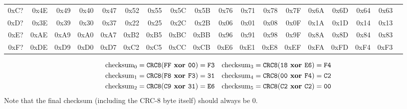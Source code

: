 \begin{table}[h]
{\begin{tabular}{|r||r|r|r|r|r|r|r|r|r|r|r|r|r|r|r|r|r|}
0xC? & 0x4E & 0x49 & 0x40 & 0x47 & 0x52 & 0x55 & 0x5C & 0x5B & 0x76 & 0x71 & 0x78 & 0x7F & 0x6A & 0x6D & 0x64 & 0x63 \\
0xD? & 0x3E & 0x39 & 0x30 & 0x37 & 0x22 & 0x25 & 0x2C & 0x2B & 0x06 & 0x01 & 0x08 & 0x0F & 0x1A & 0x1D & 0x14 & 0x13 \\
0xE? & 0xAE & 0xA9 & 0xA0 & 0xA7 & 0xB2 & 0xB5 & 0xBC & 0xBB & 0x96 & 0x91 & 0x98 & 0x9F & 0x8A & 0x8D & 0x84 & 0x83 \\
0xF? & 0xDE & 0xD9 & 0xD0 & 0xD7 & 0xC2 & 0xC5 & 0xCC & 0xCB & 0xE6 & 0xE1 & 0xE8 & 0xEF & 0xFA & 0xFD & 0xF4 & 0xF3 \\
\hline
\end{tabular}
}
\end{table}
\begin{align*}
\text{checksum}_0 = \texttt{CRC8}(\texttt{FF}\textbf{ xor }\texttt{00}) = \texttt{F3} & &
\text{checksum}_3 = \texttt{CRC8}(\texttt{18}\textbf{ xor }\texttt{E6}) = \texttt{F4} \\
\text{checksum}_1 = \texttt{CRC8}(\texttt{F8}\textbf{ xor }\texttt{F3}) = \texttt{31} & &
\text{checksum}_4 = \texttt{CRC8}(\texttt{00}\textbf{ xor }\texttt{F4}) = \texttt{C2} \\
\text{checksum}_2 = \texttt{CRC8}(\texttt{C9}\textbf{ xor }\texttt{31}) = \texttt{E6} & &
\text{checksum}_5 = \texttt{CRC8}(\texttt{C2}\textbf{ xor }\texttt{C2}) = \texttt{00} \\
\end{align*}
Note that the final checksum (including the CRC-8 byte itself)
should always be 0.


\clearpage

